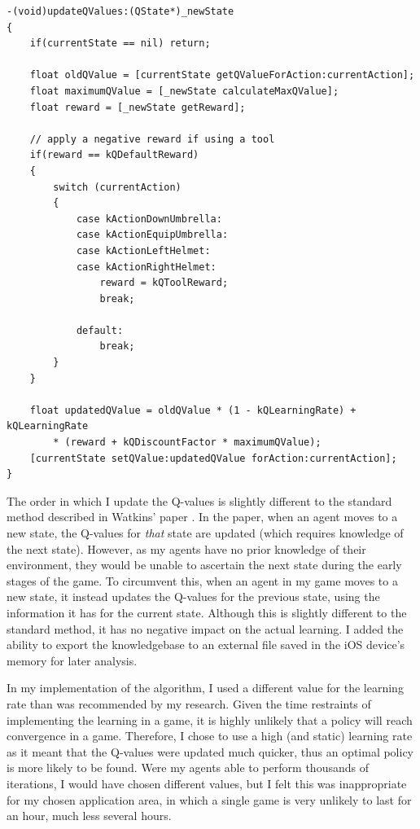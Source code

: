 \documentclass[a4paper,oneside]{report}
\begin{document}
\begin{lstlisting}[label={lst:QLearning},caption=Implementation of The Q-Learning Algorithm]
-(void)updateQValues:(QState*)_newState
{    
    if(currentState == nil) return;
            
    float oldQValue = [currentState getQValueForAction:currentAction];
    float maximumQValue = [_newState calculateMaxQValue];
    float reward = [_newState getReward];
    
    // apply a negative reward if using a tool
    if(reward == kQDefaultReward) 
    {
        switch (currentAction)
        {
            case kActionDownUmbrella:
            case kActionEquipUmbrella:
            case kActionLeftHelmet:
            case kActionRightHelmet:
                reward = kQToolReward;
                break;
                
            default:
                break;
        } 
    }
        
    float updatedQValue = oldQValue * (1 - kQLearningRate) + kQLearningRate 
    	* (reward + kQDiscountFactor * maximumQValue);
    [currentState setQValue:updatedQValue forAction:currentAction];
}
\end{lstlisting}

The order in which I update the Q-values is slightly different to the standard method described in Watkins' paper \cite{Watkins:1989mi}. In the paper, when an agent moves to a new state, the Q-values for \emph{that} state are updated (which requires knowledge of the next state). However, as my agents have no prior knowledge of their environment, they would be unable to ascertain the next state during the early stages of the game. To circumvent this, when an agent in my game moves to a new state, it instead updates the Q-values for the previous state, using the information it has for the current state. Although this is slightly different to the standard method, it has no negative impact on the actual learning. I added the ability to export the knowledgebase to an external file saved in the iOS device's memory for later analysis.

In my implementation of the algorithm, I used a different value for the learning rate than was recommended by my research. Given the time restraints of implementing the learning in a game, it is highly unlikely that a policy will reach convergence in a game. Therefore, I chose to use a high (and static) learning rate as it meant that the Q-values were updated much quicker, thus an optimal policy is more likely to be found. Were my agents able to perform thousands of iterations, I would have chosen different values, but I felt this was inappropriate for my chosen application area, in which a single game is very unlikely to last for an hour, much less several hours.
\end{document}
